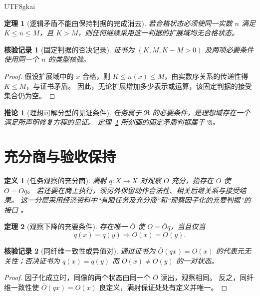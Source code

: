 \documentclass[12pt,a4paper,openany]{report}
\newtheorem{definition}{定义}[chapter]
\newtheorem{theorem}{定理}[chapter]
\newtheorem{corollary}{推论}[chapter]
\newtheorem{Certificate}{核验记录}[chapter]
\numberwithin{equation}{chapter}
\begin{document}
\begin{CJK*}{UTF8}{gkai}
\begin{theorem}[逻辑矛盾不能由保持判据的完成消去]
\label{thm:contradiction-persistence}
若合格状态必须使同一实数 $n$ 满足 $K\le n\le M$，且 $K>M$，则任何继续采用这一判据的扩展域均无合格状态。
\end{theorem}
\begin{Certificate}[固定判据的否决记录]
证书为 $(K,M,K-M>0)$ 及两项必要条件使用同一个 $n$ 的类型核验。
\end{Certificate}
\begin{proof}
假设扩展域中的 $x$ 合格，则 $K\le n(x)\le M$，由实数序关系的传递性得 $K\le M$，与证书矛盾。
因此，无论扩展增加多少表示或运算，该固定判据的接受集合仍为空。
\end{proof}

\begin{corollary}[理想可解分型的见证条件]
任务属于 $\mathfrak R$ 的必要条件，是理想域存在一个满足所声明修复方程的见证。
定理~\ref{thm:contradiction-persistence} 所刻画的固定矛盾判据属于 $\mathfrak A$。
\end{corollary}

\section{充分商与验收保持}

\begin{definition}[任务观察的充分商]
\label{def:sufficient}
满射 $q:X\to\bar X$ 对观察 $O$ 充分，指存在 $\bar O$ 使 $O=\bar Oq$。
若还要在商上执行，须另外保留动作合法性、相关后继关系与接受结果。
这一分层采用经济资料中“有限任务及充分商”和“观察因子化的充要判据”的接口
\cite[《规范竞技、多元评价与共同权利底线》，“经济任务需要保留哪些观察”节]{SourceCompetition}。
\end{definition}

\begin{theorem}[观察下降的充要条件]
\label{thm:factor}
存在唯一 $\bar O$ 使 $O=\bar Oq$，当且仅当
\[
 q(x)=q(y)\Longrightarrow O(x)=O(y).
\]
\end{theorem}
\begin{Certificate}[同纤维一致性或异值对]
通过证书为 $\bar O(qx)=O(x)$ 的代表元无关性；否决证书为 $q(x)=q(y)$ 而 $O(x)\ne O(y)$ 的一对状态。
\end{Certificate}
\begin{proof}
因子化成立时，同像的两个状态由同一个 $\bar O$ 读出，观察相同。
反之，同纤维一致性使 $\bar O(qx)=O(x)$ 良定义，满射保证处处有定义并唯一。
\end{proof}


\end{CJK*}
\end{document}
